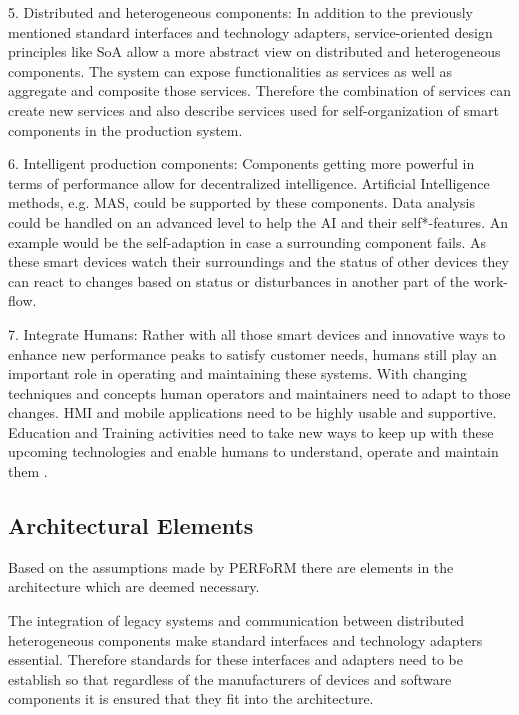 \documentclass[conference,compsoc,hidelinks]{IEEEtran}
\begin{document}
5. Distributed and heterogeneous components: In addition to the previously mentioned standard interfaces and technology adapters, service-oriented design principles like SoA allow a more abstract view on distributed and heterogeneous components. The system can expose functionalities as services as well as aggregate and composite those services. Therefore the combination of services can create new services and also describe services used for self-organization of smart components in the production system.

6. Intelligent production components: Components getting more powerful in terms of performance allow for decentralized intelligence. Artificial Intelligence methods, e.g. MAS, could be supported by these components. Data analysis could be handled on an advanced level to help the AI and their self*-features. An example would be the self-adaption in case a surrounding component fails. As these smart devices watch their surroundings and the status of other devices they can react to changes based on status or disturbances in another part of the work-flow.

7. Integrate Humans: Rather with all those smart devices and innovative ways to enhance new performance peaks to satisfy customer needs, humans still play an important role in operating and maintaining these systems. With changing techniques and concepts human operators and maintainers need to adapt to those changes. HMI and mobile applications need to be highly usable and supportive. Education and Training activities need to take new ways to keep up with these upcoming technologies and enable humans to understand, operate and maintain them \cite{SpecPERFoRM}.

\subsection{Architectural Elements}
Based on the assumptions made by PERFoRM there are elements in the architecture which are deemed necessary.

The integration of legacy systems and communication between distributed heterogeneous components make standard interfaces and technology adapters essential.
Therefore standards for these interfaces and adapters need to be establish so that regardless of the manufacturers of devices and software components it is ensured that they fit into the architecture.
\end{document}
